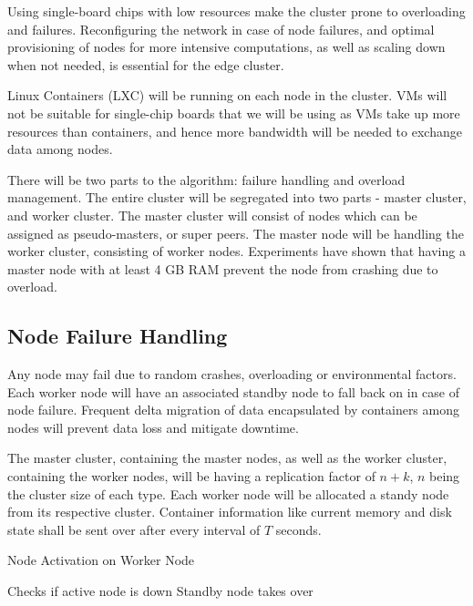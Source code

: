 \documentclass[conference]{IEEEtran}
\begin{document}
Using single-board chips with low resources make the cluster prone to overloading and failures. Reconfiguring the network in case of node failures, and optimal provisioning of nodes for more intensive computations, as well as scaling down when not needed, is essential for the edge cluster.

Linux Containers (LXC) will be running on each node in the cluster. VMs will not be suitable for single-chip boards that we will be using as VMs take up more resources than containers, and hence more bandwidth will be needed to exchange data among nodes.

There will be two parts to the algorithm: failure handling and overload management. The entire cluster will be segregated into two parts - master cluster, and worker cluster. The master cluster will consist of nodes which can be assigned as pseudo-masters, or super peers. The master node will be handling the worker cluster, consisting of worker nodes. Experiments have shown that having a master node with at least 4 GB RAM prevent the node from crashing due to overload.

\subsection{Node Failure Handling}

Any node may fail due to random crashes, overloading or environmental factors. Each worker node will have an associated standby node to fall back on in case of node failure. Frequent delta migration of data encapsulated by containers among nodes will prevent data loss and mitigate downtime.

The master cluster, containing the master nodes, as well as the worker cluster, containing the worker nodes, will be having a replication factor of $n + k$, $n$ being the cluster size of each type. Each worker node will be allocated a standy node from its respective cluster. Container information like current memory and disk state shall be sent over after every interval of $T$ seconds.

\begin{algorithm}
    \caption{Node Activation on Worker Node}
    \begin{algorithmic}[1]
            \LineComment Checks if active node is down
                \LineComment Standby node takes over
                \EndWhile
            \EndIf
        \EndFunction
    \end{algorithmic}
\end{algorithm}
\end{document}
